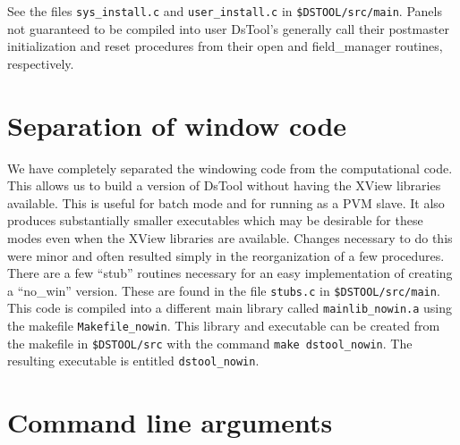 See the files {\tt sys\_install.c} and {\tt user\_install.c} in
{\tt \$DSTOOL/src/main}. Panels not guaranteed to be compiled into
user DsTool's generally call their postmaster initialization and reset
procedures from their open and field\_manager routines, respectively.


\section{Separation of window code}

We have completely separated the windowing code from the
computational code.  This allows us to build a version of
DsTool without having the XView libraries available.  This is useful
for batch mode and for running as a PVM slave.  It also produces substantially
smaller executables which may be desirable for these modes even when the XView
libraries are available.  Changes necessary to do this
were minor and often resulted simply in the reorganization of a few procedures.
There are a few ``stub'' routines necessary for an easy implementation
of creating a ``no\_win'' version.  These are found in the file
{\tt stubs.c} in {\tt \$DSTOOL/src/main}.   This code is compiled into
a different main library called {\tt mainlib\_nowin.a} using the makefile
{\tt Makefile\_nowin}.  This library and executable can be
created from the makefile in {\tt \$DSTOOL/src} with the command
{\tt make dstool\_nowin}.  The resulting executable is entitled
{\tt dstool\_nowin}.


\section{Command line arguments}

